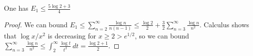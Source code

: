 \begin{proposition}
\label{E1_bound}
\leanok
One has $E_1 \leq \frac{5 \log 2 + 3}{4}$
\end{proposition}
\begin{proof}
\leanok
We can bound $E_1 \leq \sum_{n=2}^\infty \frac{\log n}{n(n-1)} \leq \frac{\log 2}{2} + \frac{3}{2} \sum_{n=3}^\infty \frac{\log n}{n^2}$.  Calculus shows that $\log x / x^2$ is decreasing for $x \geq 2 > e^{1/2}$, so we can bound $\sum_{n=3}^\infty \frac{\log n}{n^2} \leq \int_2^\infty \frac{\log t}{t^2}\ dt = \frac{\log 2+1}{2}$.
\end{proof}
